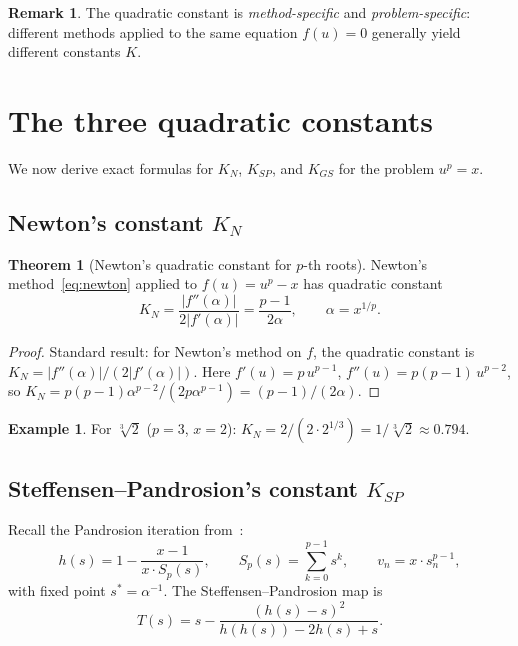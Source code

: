 \documentclass[11pt,a4paper]{article}
\theoremstyle{definition}
\newtheorem{theorem}{Theorem}[section]
\newtheorem{remark}{Remark}[section]
\newtheorem{example}{Example}[section]
\newcommand{\cbrt}[1]{\sqrt[3]{#1}}
\begin{document}
\begin{remark}
The quadratic constant is \emph{method-specific} and \emph{problem-specific}: different methods applied to the same equation $f(u) = 0$ generally yield different constants $K$.
\end{remark}

\section{The three quadratic constants}
\label{sec:constants}

We now derive exact formulas for $K_N$, $K_{SP}$, and $K_{GS}$ for the problem $u^p = x$.

\subsection{Newton's constant \texorpdfstring{$K_N$}{K\_N}}

\begin{theorem}[Newton's quadratic constant for $p$-th roots]
\label{thm:newton_constant}
Newton's method~\eqref{eq:newton} applied to $f(u) = u^p - x$ has quadratic constant
\begin{equation}
  \label{eq:KN}
  K_N = \frac{|f''(\alpha)|}{2|f'(\alpha)|} = \frac{p-1}{2\alpha},
  \qquad \alpha = x^{1/p}.
\end{equation}
\end{theorem}

\begin{proof}
Standard result: for Newton's method on $f$, the quadratic constant is $K_N = |f''(\alpha)|/(2|f'(\alpha)|)$.  Here $f'(u) = p\,u^{p-1}$, $f''(u) = p(p-1)\,u^{p-2}$, so $K_N = p(p-1)\alpha^{p-2}/(2p\alpha^{p-1}) = (p-1)/(2\alpha)$.
\end{proof}

\begin{example}
For $\cbrt{2}$ ($p=3$, $x=2$): $K_N = 2/(2 \cdot 2^{1/3}) = 1/\cbrt{2} \approx 0.794$.
\end{example}

\subsection{Steffensen--Pandrosion's constant \texorpdfstring{$K_{SP}$}{K\_SP}}

Recall the Pandrosion iteration from~\cite{besevic2026}:
\begin{equation}
  \label{eq:pandrosion}
  h(s) = 1 - \frac{x-1}{x \cdot S_p(s)},
  \qquad S_p(s) = \sum_{k=0}^{p-1} s^k,
  \qquad v_n = x \cdot s_n^{p-1},
\end{equation}
with fixed point $s^* = \alpha^{-1}$.  The Steffensen--Pandrosion map is
\[
  T(s) = s - \frac{(h(s) - s)^2}{h(h(s)) - 2h(s) + s}.
\]
\end{document}
